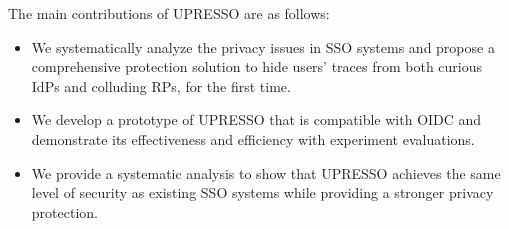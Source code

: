 

The main contributions of UPRESSO are as follows:
\begin{itemize}
\item We systematically analyze the privacy issues in SSO systems and propose a comprehensive protection solution to hide users' traces from both curious IdPs and colluding RPs, for the first time.
\item We develop a prototype of UPRESSO that is compatible with OIDC and demonstrate its effectiveness and efficiency with experiment evaluations.
\item We provide a systematic analysis to show that UPRESSO achieves the same level of security as existing SSO systems while providing a stronger privacy protection.
\end{itemize}



